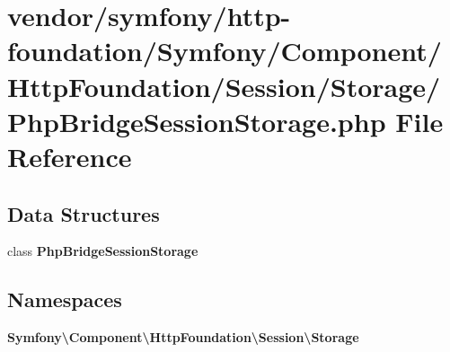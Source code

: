 \section{vendor/symfony/http-\/foundation/\+Symfony/\+Component/\+Http\+Foundation/\+Session/\+Storage/\+Php\+Bridge\+Session\+Storage.php File Reference}
\label{_php_bridge_session_storage_8php}
\subsection*{Data Structures}
\begin{DoxyCompactItemize}
\item 
class {\bf Php\+Bridge\+Session\+Storage}
\end{DoxyCompactItemize}
\subsection*{Namespaces}
\begin{DoxyCompactItemize}
\item 
 {\bf Symfony\textbackslash{}\+Component\textbackslash{}\+Http\+Foundation\textbackslash{}\+Session\textbackslash{}\+Storage}
\end{DoxyCompactItemize}
